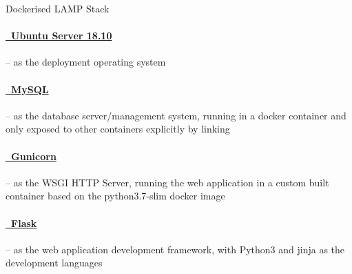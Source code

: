 \begin{displaytable}{\label{display:lamp_stack}}{Dockerised LAMP Stack}
  \paragraph{\href{http://releases.ubuntu.com/18.10/ubuntu-18.10-live-server-amd64.iso}{\faUbuntu\ Ubuntu Server 18.10}}
  \hspace{-0.6em}-- as the deployment operating system
  \paragraph{\href{https://hub.docker.com/\_/mysql}{\faDatabase\ MySQL}}
  \hspace{-0.6em}-- as the database server/management system, running in a docker container and only exposed to other containers explicitly by linking
  \paragraph{\href{https://pypi.org/project/gunicorn/}{\faServer\ Gunicorn}}
  \hspace{-0.6em}-- as the WSGI HTTP Server, running the web application in a custom built container based on the python3.7-slim docker image
  \paragraph{\href{https://pypi.org/project/Flask/1.0.2/}{\faPython\ Flask}}
  \hspace{-0.6em}-- as the web application development framework, with Python3 and jinja as the development languages
  \vspace{1em}
\end{displaytable}
